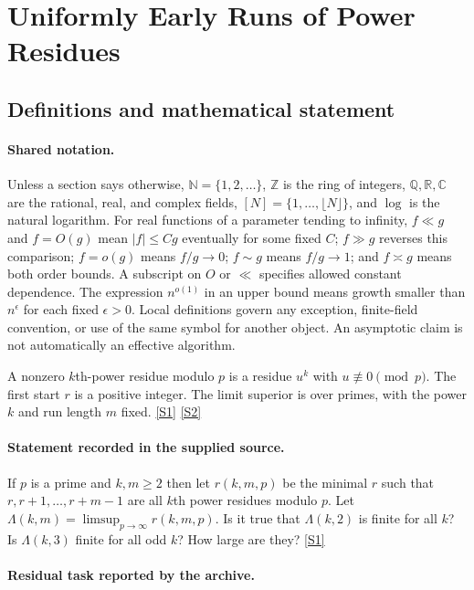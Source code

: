 \documentclass[11pt,a4paper]{article}
\newcommand{\N}{\mathbb{N}}
\newcommand{\Z}{\mathbb{Z}}
\newcommand{\Q}{\mathbb{Q}}
\newcommand{\R}{\mathbb{R}}
\newcommand{\C}{\mathbb{C}}
\newcommand{\sref}[2]{\hyperlink{source:#1:#2}{[S#2]}}
\begin{document}
\section{Uniformly Early Runs of Power Residues}\label{statement}


\subsection{Definitions and mathematical statement}

\paragraph{Shared notation.}Unless a section says otherwise, $\N=\{1,2,\ldots\}$,
$\Z$ is the ring of integers, $\Q,\R,\C$ are the rational, real, and complex
fields, $[N]=\{1,\ldots,\lfloor N\rfloor\}$, and $\log$ is the natural
logarithm. For real functions of a parameter tending to infinity,
$f\ll g$ and $f=O(g)$ mean $|f|\leq Cg$ eventually for some fixed $C$;
$f\gg g$ reverses this comparison; $f=o(g)$ means $f/g\to0$;
$f\sim g$ means $f/g\to1$; and $f\asymp g$ means both order bounds.
A subscript on $O$ or $\ll$ specifies allowed constant dependence.
The expression $n^{o(1)}$ in an upper bound means growth smaller than
$n^\epsilon$ for each fixed $\epsilon>0$. Local definitions govern any
exception, finite-field convention, or use of the same symbol for another
object. An asymptotic claim is not automatically an effective algorithm.



A nonzero $k$th-power residue modulo $p$ is a residue $u^k$ with $u\not\equiv0\pmod p$. The first start $r$ is a positive integer. The limit superior is over primes, with the power $k$ and run length $m$ fixed. \sref{statement}{1} \sref{statement}{2}

\paragraph{Statement recorded in the supplied source.}
If $p$ is a prime and $k,m\geq 2$ then let $r(k,m,p)$ be the minimal $r$ such that $r,r+1,\ldots,r+m-1$ are all $k$th power residues modulo $p$. Let $ \Lambda(k,m)=\limsup_{p\to \infty} r(k,m,p). $ Is it true that $\Lambda(k,2)$ is finite for all $k$? Is $\Lambda(k,3)$ finite for all odd $k$? How large are they? \sref{statement}{1}

\paragraph{Residual task reported by the archive.}
\end{document}
